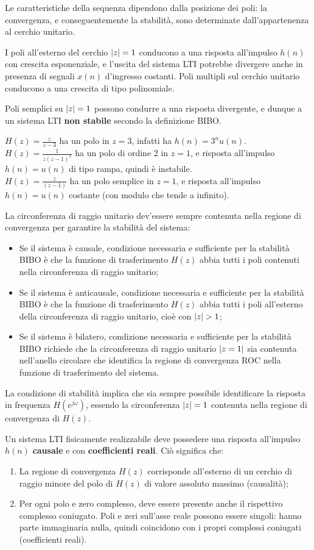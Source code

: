 Le caratteristiche della sequenza dipendono dalla posizione dei poli: la convergenza, e conseguentemente la stabilità, sono determinate dall'appartenenza al cerchio unitario.

I poli all'esterno del cerchio $\left|z\right| = 1$ conducono a una risposta all'impulso $h(n)$ con crescita esponenziale, e l'uscita del sistema LTI potrebbe divergere anche in presenza di segnali $x(n)$ d'ingresso costanti. Poli multipli sul cerchio unitario conducono a una crescita di tipo polinomiale.

Poli semplici su $\left|z\right| = 1$ possono condurre a una risposta divergente, e dunque a un sistema LTI \textbf{non stabile }secondo la definizione BIBO.

$H(z) = \frac{z}{z-3}$ ha un polo in $z = 3$, infatti ha $h(n) = 3^nu(n)$. \\
$H(z) = \frac{1}{z(z-1)^2}$ ha un polo di ordine 2 in $z = 1$, e risposta all'impulso $h(n) = u(n)$ di tipo rampa, quindi è instabile. \\
$H(z) = \frac{z}{(z-1)}$ ha un polo semplice in $z = 1$, e risposta all'impulso $h(n) = u(n)$ costante (con modulo che tende a infinito).

La circonferenza di raggio unitario dev'essere sempre contenuta nella regione di convergenza per garantire la stabilità del sistema:
\begin{itemize}
	\item Se il sistema è causale, condizione necessaria e sufficiente per la stabilità BIBO è che la funzione di trasferimento $H(z)$ abbia tutti i poli contenuti nella circonferenza di raggio unitario;
	\item Se il sistema è anticausale, condizione necessaria e sufficiente per la stabilità BIBO è che la funzione di trasferimento $H(z)$ abbia tutti i poli all'esterno della circonferenza di raggio unitario, cioè con $\left|z\right| > 1$;
	\item Se il sistema è bilatero, condizione necessaria e sufficiente per la stabilità BIBO richiede che la circonferenza di raggio unitario $\left|z = 1\right|$ sia contenuta nell'anello circolare che identifica la regione di convergenza ROC nella funzione di trasferimento del sistema.
\end{itemize}

La condizione di stabilità implica che sia sempre possibile identificare la risposta in frequenza $H(e^{j\omega})$, essendo la circonferenza $\left|z\right| = 1$ contenuta nella regione di convergenza di $H(z)$.

Un sistema LTI fisicamente realizzabile deve possedere una risposta all'impulso $h(n)$ \textbf{causale} e con \textbf{coefficienti reali}. Ciò significa che:
\begin{enumerate}
	\item La regione di convergenza $H(z)$ corrisponde all'esterno di un cerchio di raggio minore del polo di $H(z)$ di valore assoluto massimo (causalità);
	\item Per ogni polo e zero complesso, deve essere presente anche il rispettivo complesso coniugato. Poli e zeri sull'asse reale possono essere singoli: hanno parte immaginaria nulla, quindi coincidono con i propri complessi coniugati (coefficienti reali).
\end{enumerate}

